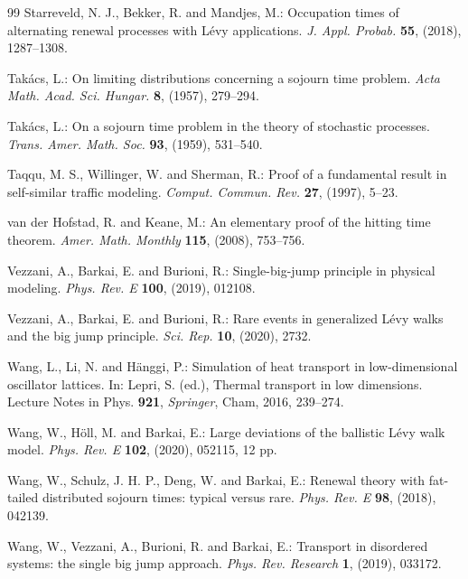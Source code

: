 \documentclass[EJP,preprint]{ejpecp}
\theoremstyle{ejpecpbodyit}
\begin{document}
\begin{thebibliography}{99}
 Starreveld, N. J., Bekker, R. and Mandjes, M.: Occupation times of
  alternating renewal processes with L\'evy applications. \emph{J. Appl. Probab.}
  \textbf{55}, (2018), 1287--1308. 

 Tak\'acs, L.: On limiting distributions concerning a
  sojourn time problem. \emph{Acta Math. Acad. Sci. Hungar.} \textbf{8},
  (1957), 279--294.

 Tak\'acs, L.: On a sojourn time problem in the theory of
  stochastic processes. \emph{Trans. Amer. Math. Soc.} \textbf{93}, (1959),
  531--540. 

 Taqqu, M. S., Willinger, W. and Sherman, R.: Proof of a fundamental
  result in self-similar traffic modeling. \emph{Comput. Commun. Rev.} \textbf{27}, (1997),
  5--23.

 van der Hofstad, R. and Keane, M.: An elementary proof of the hitting
  time theorem. \emph{Amer. Math. Monthly} \textbf{115}, (2008), 753--756. 

 Vezzani, A., Barkai, E. and Burioni, R.: Single-big-jump
  principle in physical modeling. \emph{Phys. Rev. E} \textbf{100}, (2019),
  012108.

 Vezzani, A., Barkai, E. and Burioni, R.: Rare events in
  generalized L\'evy walks and the big jump principle. \emph{Sci. Rep.}
  \textbf{10}, (2020), 2732.

 Wang, L., Li, N. and H\"anggi, P.: Simulation of heat
  transport in low-dimensional oscillator lattices. In: Lepri, S. (ed.),
  Thermal transport in low dimensions. Lecture Notes in Phys. \textbf{921},
  \emph{Springer}, Cham, 2016, 239--274. 

 Wang, W., H\"oll, M. and Barkai, E.: Large deviations of the
  ballistic L\'evy walk model. \emph{Phys. Rev. E} \textbf{102}, (2020),
  052115, 12 pp. 

 Wang, W., Schulz, J. H. P., Deng, W. and Barkai, E.:
  Renewal theory with fat-tailed distributed sojourn times: typical versus
  rare. \emph{Phys. Rev. E} \textbf{98}, (2018), 042139. 

 Wang, W., Vezzani, A., Burioni, R. and Barkai, E.:
  Transport in disordered systems: the single big jump approach. \emph{Phys.
  Rev. Research} \textbf{1}, (2019), 033172. 


\end{thebibliography}
\end{document}
